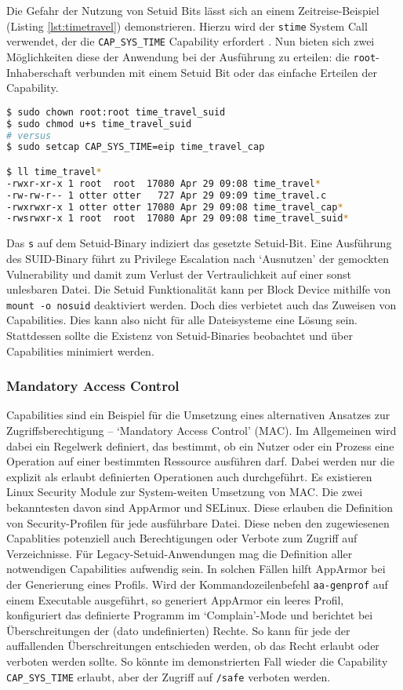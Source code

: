 Die Gefahr der Nutzung von Setuid Bits lässt sich an einem Zeitreise-Beispiel (Listing \ref{lst:timetravel}) demonstrieren. Hierzu wird der \texttt{stime} System Call verwendet, der die \texttt{CAP\_SYS\_TIME} Capability erfordert \cite{man-cap}. Nun bieten sich zwei Möglichkeiten diese der Anwendung bei der Ausführung zu erteilen: die \texttt{root}-Inhaberschaft verbunden mit einem Setuid Bit oder das einfache Erteilen der Capability.


\begin{lstlisting}[language=bash,label={lst:timetravel}]
$ sudo chown root:root time_travel_suid
$ sudo chmod u+s time_travel_suid 
# versus
$ sudo setcap CAP_SYS_TIME=eip time_travel_cap

$ ll time_travel*
-rwxr-xr-x 1 root  root  17080 Apr 29 09:08 time_travel*
-rw-rw-r-- 1 otter otter   727 Apr 29 09:09 time_travel.c
-rwxrwxr-x 1 otter otter 17080 Apr 29 09:08 time_travel_cap*
-rwsrwxr-x 1 root  root  17080 Apr 29 09:08 time_travel_suid*
\end{lstlisting}

Das \texttt{s} auf dem Setuid-Binary indiziert das gesetzte Setuid-Bit. Eine Ausführung des SUID-Binary führt zu Privilege Escalation nach `Ausnutzen' der gemockten Vulnerability und damit zum Verlust der Vertraulichkeit auf einer sonst unlesbaren Datei. Die Setuid Funktionalität kann per Block Device mithilfe von \texttt{mount -o nosuid} deaktiviert werden. Doch dies verbietet auch das Zuweisen von Capabilities. Dies kann also nicht für alle Dateisysteme eine Lösung sein. Stattdessen sollte
die Existenz von Setuid-Binaries beobachtet und über Capabilities minimiert werden.

\subsubsection{Mandatory Access Control}

Capabilities sind ein Beispiel für die Umsetzung eines alternativen Ansatzes zur Zugriffsberechtigung -- `Mandatory Access Control' (MAC). Im Allgemeinen wird dabei ein Regelwerk definiert, das bestimmt, ob ein Nutzer oder ein Prozess eine Operation auf einer bestimmten Ressource ausführen darf. Dabei werden nur die explizit als erlaubt definierten Operationen auch durchgeführt. Es existieren Linux Security Module zur System-weiten Umsetzung von MAC. Die zwei bekanntesten davon
sind AppArmor und SELinux. Diese erlauben die Definition von Security-Profilen für jede ausführbare Datei. Diese neben den zugewiesenen Capablities potenziell auch Berechtigungen oder Verbote zum Zugriff auf Verzeichnisse. Für Legacy-Setuid-Anwendungen mag die Definition aller notwendigen Capabilities aufwendig sein. In solchen Fällen hilft AppArmor bei der Generierung eines Profils. Wird der Kommandozeilenbefehl \texttt{aa-genprof} auf einem Executable ausgeführt, so generiert
AppArmor ein leeres Profil, konfiguriert das definierte Programm im `Complain'-Mode und berichtet bei Überschreitungen der (dato undefinierten) Rechte. So kann für jede der auffallenden Überschreitungen entschieden werden, ob das Recht erlaubt oder verboten werden sollte. So könnte im demonstrierten Fall wieder die Capability \texttt{CAP\_SYS\_TIME} erlaubt, aber der Zugriff auf \texttt{/safe} verboten werden.


